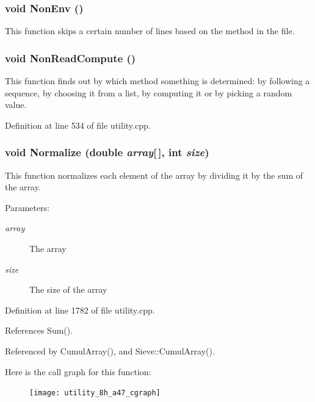 \subsubsection{\setlength{\rightskip}{0pt plus 5cm}void Non\-Env ()}\label{utility_8h_a25}


This function skips a certain number of lines based on the method in the file. 
\subsubsection{\setlength{\rightskip}{0pt plus 5cm}void Non\-Read\-Compute ()}\label{utility_8h_a15}


This function finds out by which method something is determined: by following a sequence, by choosing it from a list, by computing it or by picking a random value. 

Definition at line 534 of file utility.cpp.
\subsubsection{\setlength{\rightskip}{0pt plus 5cm}void Normalize (double {\em array}[$\,$], int {\em size})}\label{utility_8h_a47}


This function normalizes each element of the array by dividing it by the sum of the array. \begin{Desc}
\item[Parameters:]
\begin{description}
\item[{\em array}]The array \item[{\em size}]The size of the array \end{description}
\end{Desc}


Definition at line 1782 of file utility.cpp.

References Sum().

Referenced by Cumul\-Array(), and Sieve::Cumul\-Array().

Here is the call graph for this function:\begin{figure}[H]
\begin{center}
\leavevmode
\texttt{[image: utility\_8h\_a47\_cgraph]}
\end{center}
\end{figure}
